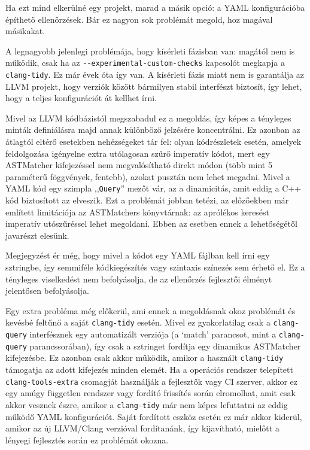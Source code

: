 Ha ezt mind elkerülné egy projekt, marad a másik opció: a YAML konfigurációba építhető ellenőrzések.
Bár ez nagyon sok problémát megold, hoz magával másikakat.

A legnagyobb jelenlegi problémája, hogy kísérleti fázisban van: magától nem is működik, csak ha az {\tt -\relax-experimental-custom-checks} kapcsolót megkapja a {\tt clang-tidy}.
Ez már évek óta így van.
A kísérleti fázis miatt nem is garantálja az LLVM projekt, hogy verziók között bármilyen stabil interfészt biztosít, így lehet, hogy a teljes konfigurációt át kellhet írni.

Mivel az LLVM kódbázistól megszabadul ez a megoldás, így képes a tényleges minták definiálásra majd annak különböző jelzésére koncentrálni.
Ez azonban az átlagtól eltérő esetekben nehézségeket tár fel: olyan kódrészletek esetén, amelyek feldolgozása igényelne extra utólagosan szűrő imperatív kódot, mert egy ASTMatcher kifejezéssel nem megvalósítható direkt módon (\pl több mint 5 paraméterű föggvények, \ld fentebb), azokat pusztán nem lehet megadni.
Mivel a YAML kód egy szimpla ,,{\tt Query}'' mezőt vár, az a dinamicitás, amit eddig a C++ kód biztosított az elveszik.
Ezt a problémát jobban tetézi, az előzőekben már említett limitációja az ASTMatchers könyvtárnak: az aprólékos keresést imperatív utószűréssel lehet megoldani.
Ebben az esetben ennek a lehetőségétől javarészt elesünk.

Megjegyzést ér még, hogy mivel a kódot egy YAML fájlban kell írni egy sztringbe, így semmiféle kódkiegészítés vagy szintaxis színezés sem érhető el.
Ez a tényleges viselkedést nem befolyásolja, de az ellenőrzés fejlesztői élményt jelentősen befolyásolja.

Egy extra probléma még előkerül, ami ennek a megoldásnak okoz problémát és kevésbé feltűnő a saját {\tt clang-tidy} esetén.
Mivel ez gyakorlatilag csak a {\tt clang-query} interfésznek egy automatizált verziója (\ld a `match' parancsot, mint a {\tt clang-query} parancssorában), így csak a sztringet fordítja egy dinamikus ASTMatcher kifejezésbe.
Ez azonban csak akkor működik, amikor a használt {\tt clang-tidy} támogatja az adott kifejezés minden elemét.
Ha a operációs rendszer telepített {\tt clang-tools-extra} csomagját használják a fejlesztők vagy \gls{CI} szerver, akkor ez egy amúgy független rendszer vagy fordító frissítés során elromolhat, amit csak akkor vesznek észre, amikor a {\tt clang-tidy} már nem képes lefuttatni az eddig működő YAML konfigurációt.
Saját fordított eszköz esetén ez már akkor kiderül, amikor az új LLVM/Clang verzióval fordítanánk, így kijavítható, mielőtt a lényegi fejlesztés során ez problémát okozna.


